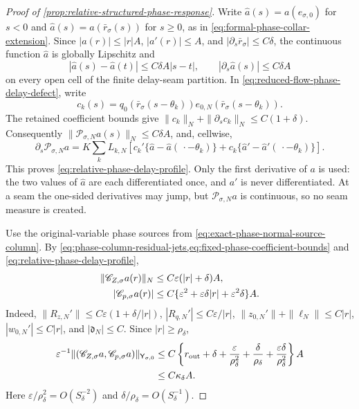 \begin{proof}[Proof of
\cref{prop:relative-structured-phase-response}]
Write \(\widehat a(s)=a(e_{\sigma,0})\) for \(s<0\) and
\(\widehat a(s)=a(\bar r_\sigma(s))\) for \(s\ge0\), as in
\cref{eq:formal-phase-collar-extension}.  Since
\(|a(r)|\le |r|A\), \(|a'(r)|\le A\), and
\(|\partial_s\bar r_\sigma|\le C\delta\), the continuous function
\(\widehat a\) is globally Lipschitz and
\[
 |\widehat a(s)-\widehat a(t)|\le C\delta A|s-t|,
 \qquad |\partial_s\widehat a(s)|\le C\delta A
\]
on every open cell of the finite delay-seam partition.  In
\cref{eq:reduced-flow-phase-delay-defect}, write
\[
 c_k(s)=q_0(\bar r_\sigma(s-\theta_k))
       e_{0,N}(\bar r_\sigma(s-\theta_k)).
\]
The retained coefficient bounds give
\(\|c_k\|_N+\|\partial_sc_k\|_N\le C(1+\delta)\).
Consequently
\(\|\mathscr P_{\sigma,N}a(s)\|_N\le C\delta A\), and, cellwise,
\[
 \partial_s\mathscr P_{\sigma,N}a
 =K\sum_kL_{k,N}\left[
   c_k'\{\widehat a-\widehat a(\,\cdot-\theta_k)\}
  +c_k\{\widehat a'-\widehat a'(\,\cdot-\theta_k)\}\right].
\]
This proves \cref{eq:relative-phase-delay-profile}.  Only the first
derivative of \(a\) is used: the two values of \(\widehat a\) are each
differentiated once, and \(a'\) is never differentiated.  At a seam the
one-sided derivatives may jump, but
\(\mathscr P_{\sigma,N}a\) is continuous, so no seam measure is created.

Use the original-variable phase sources from
\cref{eq:exact-phase-normal-source-column}.  By
\cref{eq:phase-column-residual-jets,eq:fixed-phase-coefficient-bounds}
and \cref{eq:relative-phase-delay-profile},
\begin{align}
 \|\mathscr C_{Z,\sigma}a(r)\|_N
 &\le C\varepsilon(|r|+\delta)A,\notag\\
 |\mathscr C_{p,\sigma}a(r)|
 &\le C\{\varepsilon^2
       +\varepsilon\delta|r|+\varepsilon^2\delta\}A.
                                                        \label{eq:relative-phase-normal-source-profile}
\end{align}
Indeed,
\(\|R_{z,N}'\|\le C\varepsilon(1+\delta/|r|)\),
\(|R_{q,N}'|\le C\varepsilon/|r|\),
\(\|z_{0,N}'\|+\|\ell_N\|\le C|r|\),
\(|w_{0,N}'|\le C|r|\), and
\(|\mathfrak d_N|\le C\).
Since \(|r|\ge\rho_\delta\),
\begin{align}
 \varepsilon^{-1}
 \|(\mathscr C_{Z,\sigma}a,\mathscr C_{p,\sigma}a)\|_{
       \mathsf Y_{\sigma,0}}
 &\le C\left\{r_{\rm out}+\delta
 +\frac{\varepsilon}{\rho_\delta^2}
 +\frac{\delta}{\rho_\delta}
 +\frac{\varepsilon\delta}{\rho_\delta^2}\right\}A\notag\\
 &\le C\kappa_\delta A.                           \label{eq:relative-phase-normal-data-bound}
\end{align}
Here
\(\varepsilon/\rho_\delta^2=O(S_\delta^{-2})\) and
\(\delta/\rho_\delta=O(S_\delta^{-1})\).


\end{proof}
